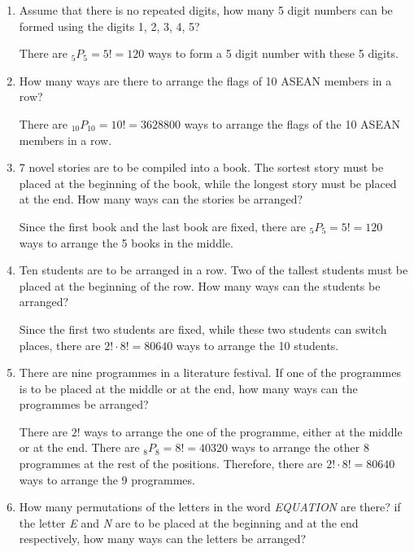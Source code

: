 \documentclass{report}
\newcommand\permtwo[2][^n]{{}_{#1}P_{#2}}
\begin{document}
\begin{multicols}{2}
  \begin{enumerate}
    \item Assume that there is no repeated digits, how many 5 digit numbers can be formed
          using the digits 1, 2, 3, 4, 5? \sol{}

          There are $\permtwo[5]{5} = 5! = 120$ ways to form a 5 digit number with these
          5 digits.

    \item How many ways are there to arrange the flags of 10 ASEAN members in a row?
          \sol{}

          There are $\permtwo[10]{10} = 10! = 3628800$ ways to arrange the flags of the
          10 ASEAN members in a row.

    \item 7 novel stories are to be compiled into a book. The sortest story must be placed
          at the beginning of the book, while the longest story must be placed at the end. How many ways can the stories be arranged?
          \sol{}

          Since the first book and the last book are fixed, there are $\permtwo[5]{5} =
            5! = 120$ ways to arrange the 5 books in the middle.

    \item Ten students are to be arranged in a row. Two of the tallest students must be
          placed at the beginning of the row. How many ways can the students be arranged?
          \sol{}

          Since the first two students are fixed, while these two students can switch
          places, there are $2! \cdot 8! = 80640$ ways to arrange the 10 students.

    \item There are nine programmes in a literature festival. If one of the programmes is
          to be placed at the middle or at the end, how many ways can the programmes be
          arranged? \sol{}

          There are $2!$ ways to arrange the one of the programme, either at the middle
          or at the end. There are $\permtwo[8]{8} = 8! = 40320$ ways to arrange the
          other 8 programmes at the rest of the positions. Therefore, there are $2! \cdot
            8! = 80640$ ways to arrange the 9 programmes.

    \item How many permutations of the letters in the word \textit{EQUATION} are there?
          if the letter \textit{E} and \textit{N} are to be placed at the beginning and
          at the end respectively, how many ways can the letters be arranged? \sol{}


\end{enumerate}
\end{multicols}
\end{document}
